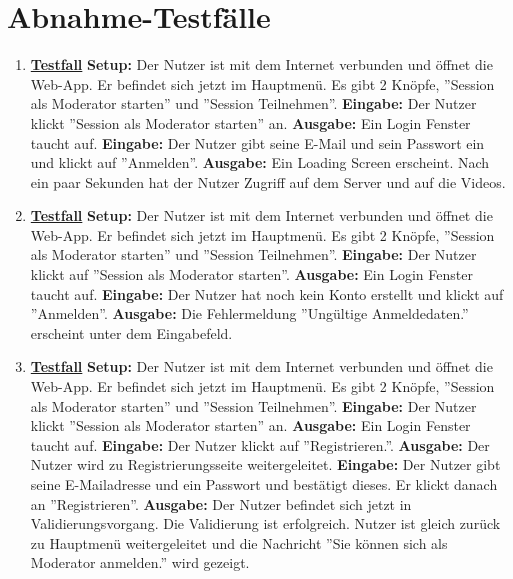 \section{Abnahme-Testfälle}
\begin{enumerate}
	\item \underline{\textbf{Testfall}} \linebreak
	\textbf{Setup:} Der Nutzer ist mit dem Internet verbunden und öffnet die Web-App. Er befindet sich jetzt im Hauptmenü. Es gibt 2 Knöpfe, ''Session als Moderator starten'' und ''Session Teilnehmen''.\linebreak
	\textbf{Eingabe:} Der Nutzer klickt ''Session als Moderator starten'' an.\linebreak
	\textbf{Ausgabe:} Ein Login Fenster taucht auf.\linebreak
	\textbf{Eingabe:} Der Nutzer gibt seine E-Mail und sein Passwort ein und klickt auf ''Anmelden''.\linebreak
	\textbf{Ausgabe:} Ein Loading Screen erscheint. Nach ein paar Sekunden hat der Nutzer Zugriff auf dem Server und auf die Videos.
	
	\item \underline{\textbf{Testfall}} \linebreak
	\textbf{Setup:} Der Nutzer ist mit dem Internet verbunden und öffnet die Web-App. Er befindet sich jetzt im Hauptmenü. Es gibt 2 Knöpfe, ''Session als Moderator starten'' und ''Session Teilnehmen''. \linebreak
	\textbf{Eingabe:} Der Nutzer klickt auf ''Session als Moderator starten''. \linebreak
	\textbf{Ausgabe:} Ein Login Fenster taucht auf.\linebreak
	\textbf{Eingabe:} Der Nutzer hat noch kein Konto erstellt und klickt auf ''Anmelden''.\linebreak
	\textbf{Ausgabe:} Die Fehlermeldung ''Ungültige Anmeldedaten.'' erscheint unter dem Eingabefeld.
	
	\item \underline{\textbf{Testfall}} \linebreak
	\textbf{Setup:} Der Nutzer ist mit dem Internet verbunden und öffnet die Web-App. Er befindet sich jetzt im Hauptmenü. Es gibt 2 Knöpfe, ''Session als Moderator starten'' und ''Session Teilnehmen''.\linebreak
	\textbf{Eingabe:} Der Nutzer klickt ''Session als Moderator starten'' an. \linebreak
	\textbf{Ausgabe:} Ein Login Fenster taucht auf.\linebreak
	\textbf{Eingabe:} Der Nutzer klickt auf ''Registrieren.''.\linebreak
	\textbf{Ausgabe:} Der Nutzer wird zu Registrierungsseite weitergeleitet.\linebreak
	\textbf{Eingabe:} Der Nutzer gibt seine E-Mailadresse und ein Passwort und bestätigt dieses. Er klickt danach an ''Registrieren''. \linebreak
	\textbf{Ausgabe:} Der Nutzer befindet sich jetzt in Validierungsvorgang. Die Validierung ist erfolgreich. Nutzer ist gleich zurück zu Hauptmenü weitergeleitet und die Nachricht ''Sie können sich als Moderator anmelden.'' wird gezeigt.
	

\end{enumerate}
